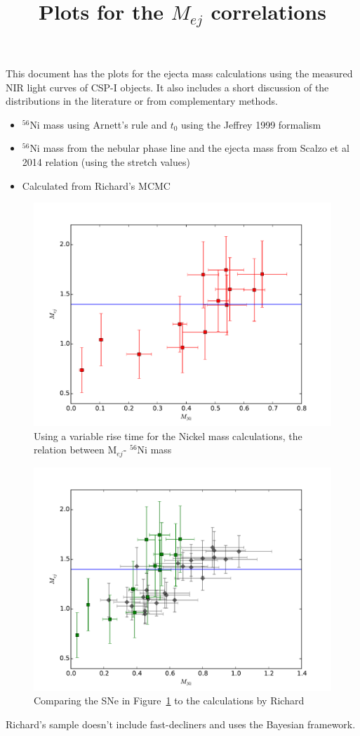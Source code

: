 \documentclass{article}
\newcommand{\Nif}{\rm $^{56}$Ni }
\begin{document}
\title{Plots for the $M_{ej}$ correlations}
\maketitle

This document has the plots for the ejecta mass calculations using the measured NIR light curves of CSP-I objects. It also includes a short discussion of the distributions in the literature or from complementary methods.

\begin{itemize}

\item \Nif mass using Arnett's rule and $t_0$ using the Jeffrey 1999 formalism

\item \Nif mass from the nebular phase line and the ejecta mass from Scalzo et al 2014 relation (using the stretch values)

\item Calculated from Richard's MCMC

\end{itemize}


\begin{figure}
\includegraphics[width=.5\textwidth, trim = 0 0 30 30]{mej_mni_risetime.pdf}
\caption{Using a variable rise time for the Nickel mass calculations, the relation between M$_{ej}$- \Nif mass}
\label{fig:mej-mni}
\end{figure}

\begin{figure}
\includegraphics[width=.5\textwidth, trim = 0 0 30 30]{mej_mni_richard_comparison.pdf}
\caption{Comparing the SNe in Figure~\ref{fig:mej-mni} to the calculations by Richard}
\end{figure}

Richard's sample doesn't include fast-decliners and uses the Bayesian framework.
\end{document}
